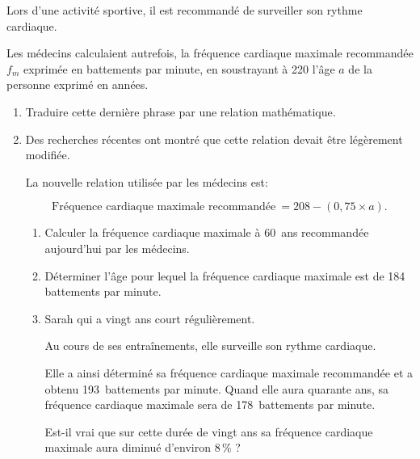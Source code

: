 
\medskip

Lors d'une activité sportive, il est recommandé de surveiller son rythme cardiaque.

Les médecins calculaient autrefois, la fréquence cardiaque maximale recommandée $f_m$ exprimée en battements par minute, en soustrayant à 220 l'âge $a$ de la personne exprimé en années. 

\medskip

\begin{enumerate}
\item Traduire cette dernière phrase par une relation mathématique. 
\item Des recherches récentes ont montré que cette relation devait être légèrement modifiée. 

La nouvelle relation utilisée par les médecins est: 

\[\text{Fréquence cardiaque maximale recommandée}\: = 208 - (0,75 \times a).\] 

	\begin{enumerate}
		\item Calculer la fréquence cardiaque maximale à 60~ans recommandée aujourd'hui par les médecins. 
		\item Déterminer l'âge pour lequel la fréquence cardiaque maximale est de 184 battements par minute. 
		\item Sarah qui a vingt ans court régulièrement.
		
Au cours de ses entraînements, elle surveille son rythme cardiaque. 

Elle a ainsi déterminé sa fréquence cardiaque maximale recommandée et a obtenu 193~battements par minute. Quand elle aura quarante ans, sa fréquence cardiaque maximale sera de 178~battements par minute. 

Est-il vrai que sur cette durée de vingt ans sa fréquence cardiaque maximale aura diminué d'environ 8\,\% ?
	\end{enumerate} 
\end{enumerate}

\vspace{0,5cm}

